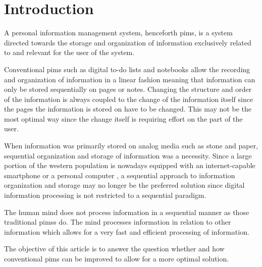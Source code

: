 \section{Introduction}

A personal information management system, henceforth \gls{pims}, is a system
directed towards the storage and organization of information exclusively
related to and relevant for the user of the system.

Conventional \gls{pims} such as digital to-do lists and notebooks allow the
recording and organization of information in a linear fashion meaning that
information can only be stored sequentially on pages or notes. Changing the
structure and order of the information is always coupled to the change of the
information itself since the pages the information is stored on have to be
changed. This may not be the most optimal way since the change itself is
requiring effort on the part of the user.

When information was primarily stored on analog media such as stone and paper,
sequential organization and storage of information was a necessity. Since a
large portion of the western population is nowadays equipped with an
internet-capable smartphone or a personal computer \cite{rainie2010internet}, a
sequential approach to information organization and storage may no longer be
the preferred solution since digital information processing is not restricted
to a sequential paradigm.

The human mind does not process information in a sequential manner as those
traditional \glspl{pims} do. \cite{Sowa:1984:CSI:4569} The mind
processes information in relation to other information which allows for a very
fast and efficient processing of information.

The objective of this article is to answer the question whether and how
conventional \gls{pims} can be improved to allow for a more optimal solution.

\iffalse
0 problem
1st problem
2nd introduction / storyline why not optimal
3rd criteria of possible solution
4rd proposition
5 conclusion / why system more optimal / research question
\fi
